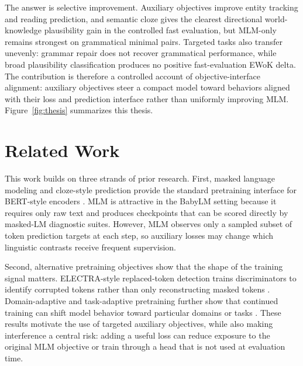 \documentclass[11pt]{article}
\begin{document}
The answer is selective improvement.
Auxiliary objectives improve entity tracking and reading prediction, and semantic cloze gives the clearest directional world-knowledge plausibility gain in the controlled fast evaluation, but MLM-only remains strongest on grammatical minimal pairs.
Targeted tasks also transfer unevenly: grammar repair does not recover grammatical performance, while broad plausibility classification produces no positive fast-evaluation EWoK delta.
The contribution is therefore a controlled account of objective-interface alignment: auxiliary objectives steer a compact model toward behaviors aligned with their loss and prediction interface rather than uniformly improving MLM.
Figure~\ref{fig:thesis} summarizes this thesis.

\section{Related Work}

This work builds on three strands of prior research.
First, masked language modeling and cloze-style prediction provide the standard pretraining interface for BERT-style encoders \citep{taylor1953cloze,devlin2019bert}.
MLM is attractive in the BabyLM setting because it requires only raw text and produces checkpoints that can be scored directly by masked-LM diagnostic suites.
However, MLM observes only a sampled subset of token prediction targets at each step, so auxiliary losses may change which linguistic contrasts receive frequent supervision.

Second, alternative pretraining objectives show that the shape of the training signal matters.
ELECTRA-style replaced-token detection trains discriminators to identify corrupted tokens rather than only reconstructing masked tokens \citep{clark2020electra}.
Domain-adaptive and task-adaptive pretraining further show that continued training can shift model behavior toward particular domains or tasks \citep{gururangan2020dont}.
These results motivate the use of targeted auxiliary objectives, while also making interference a central risk: adding a useful loss can reduce exposure to the original MLM objective or train through a head that is not used at evaluation time.
\end{document}
